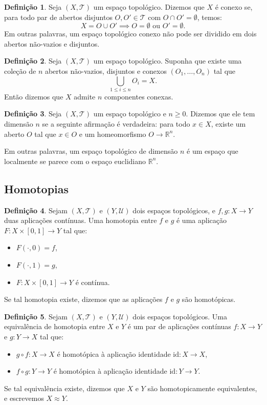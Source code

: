 \documentclass[12pt, a4paper]{article}
\theoremstyle{plain}
\theoremstyle{definition}
\newtheorem{definition}{Definição}[section]
\theoremstyle{remark}
\begin{document}
\begin{definition}
Seja $(X, \mathcal{T})$ um espaço topológico. Dizemos que $X$ é conexo se, para todo par de abertos disjuntos $O, O' \in \mathcal{T}$ com $O \cap O' = \emptyset$, temos:
\[
X = O \cup O' \implies O = \emptyset \text{ ou } O' = \emptyset.
\]
Em outras palavras, um espaço topológico conexo não pode ser dividido em dois abertos não-vazios e disjuntos.
\end{definition}

\begin{definition}
Seja $(X, \mathcal{T})$ um espaço topológico. Suponha que existe uma coleção de $n$ abertos não-vazios, disjuntos e conexos $(O_1, \ldots, O_n)$ tal que
\[
\bigcup_{1 \leq i \leq n} O_i = X.
\]
Então dizemos que $X$ admite $n$ componentes conexas.
\end{definition}

\begin{definition}
Seja $(X, \mathcal{T})$ um espaço topológico e $n \geq 0$. Dizemos que ele tem dimensão $n$ se a seguinte afirmação é verdadeira: para todo $x \in X$, existe um aberto $O$ tal que $x \in O$ e um homeomorfismo $O \to \mathbb{R}^n$.

Em outras palavras, um espaço topológico de dimensão $n$ é um espaço que localmente se parece com o espaço euclidiano $\mathbb{R}^n$.
\end{definition}

\subsection{Homotopias}

\begin{definition}
Sejam $(X, \mathcal{T})$ e $(Y, \mathcal{U})$ dois espaços topológicos, e $f, g: X \to Y$ duas aplicações contínuas. Uma homotopia entre $f$ e $g$ é uma aplicação $F: X \times [0,1] \to Y$ tal que:
\begin{itemize}
    \item $F(\cdot, 0) = f$,
    \item $F(\cdot, 1) = g$,
    \item $F: X \times [0,1] \to Y$ é contínua.
\end{itemize}
Se tal homotopia existe, dizemos que as aplicações $f$ e $g$ são homotópicas.
\end{definition}

\begin{definition}
Sejam $(X, \mathcal{T})$ e $(Y, \mathcal{U})$ dois espaços topológicos. Uma equivalência de homotopia entre $X$ e $Y$ é um par de aplicações contínuas $f: X \to Y$ e $g: Y \to X$ tal que:
\begin{itemize}
    \item $g \circ f: X \to X$ é homotópica à aplicação identidade $\mathrm{id}: X \to X$,
    \item $f \circ g: Y \to Y$ é homotópica à aplicação identidade $\mathrm{id}: Y \to Y$.
\end{itemize}
Se tal equivalência existe, dizemos que $X$ e $Y$ são homotopicamente equivalentes, e escrevemos $X \approx Y$.
\end{definition}
\end{document}
